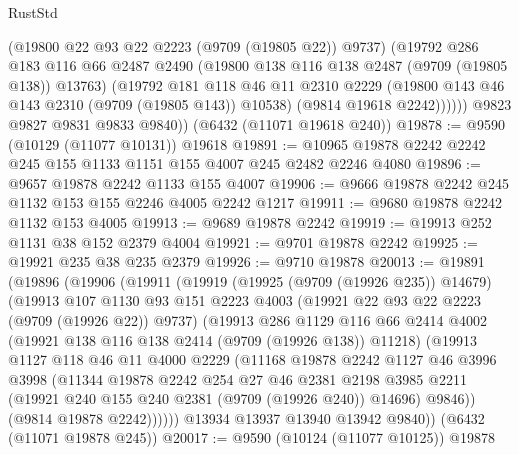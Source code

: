 \begin{lexlean}{RustStd}
\begin{coremodule}
              (@19800 @22 @93 @22 @2223 (@9709 (@19805 @22)) @9737)
              (@19792
                @286
                @183
                @116
                @66
                @2487
                @2490
                (@19800 @138 @116 @138 @2487 (@9709 (@19805 @138)) @13763)
                (@19792
                  @181
                  @118
                  @46
                  @11
                  @2310
                  @2229
                  (@19800 @143 @46 @143 @2310 (@9709 (@19805 @143)) @10538)
                  (@9814 @19618 @2242))))))
        @9823
        @9827
        @9831
        @9833
        @9840))
    (@6432 (@11071 @19618 @240))
@19878 := @9590 (@10129 (@11077 @10131)) @19618
@19891 := @10965 @19878 @2242 @2242 @245 @155 @1133 @1151 @155 @4007 @245 @2482 @2246 @4080
@19896 := @9657 @19878 @2242 @1133 @155 @4007
@19906 := @9666 @19878 @2242 @245 @1132 @153 @155 @2246 @4005 @2242 @1217
@19911 := @9680 @19878 @2242 @1132 @153 @4005
@19913 := @9689 @19878 @2242
@19919 := @19913 @252 @1131 @38 @152 @2379 @4004
@19921 := @9701 @19878 @2242
@19925 := @19921 @235 @38 @235 @2379
@19926 := @9710 @19878
@20013 := @19891
    (@19896
      (@19906
        (@19911
          (@19919
            (@19925 (@9709 (@19926 @235)) @14679)
            (@19913
              @107
              @1130
              @93
              @151
              @2223
              @4003
              (@19921 @22 @93 @22 @2223 (@9709 (@19926 @22)) @9737)
              (@19913
                @286
                @1129
                @116
                @66
                @2414
                @4002
                (@19921 @138 @116 @138 @2414 (@9709 (@19926 @138)) @11218)
                (@19913
                  @1127
                  @118
                  @46
                  @11
                  @4000
                  @2229
                  (@11168
                    @19878
                    @2242
                    @1127
                    @46
                    @3996
                    @3998
                    (@11344
                      @19878
                      @2242
                      @254
                      @27
                      @46
                      @2381
                      @2198
                      @3985
                      @2211
                      (@19921 @240 @155 @240 @2381 (@9709 (@19926 @240)) @14696)
                      @9846))
                  (@9814 @19878 @2242))))))
        @13934
        @13937
        @13940
        @13942
        @9840))
    (@6432 (@11071 @19878 @245))
@20017 := @9590 (@10124 (@11077 @10125)) @19878

\end{coremodule}
\end{lexlean}
